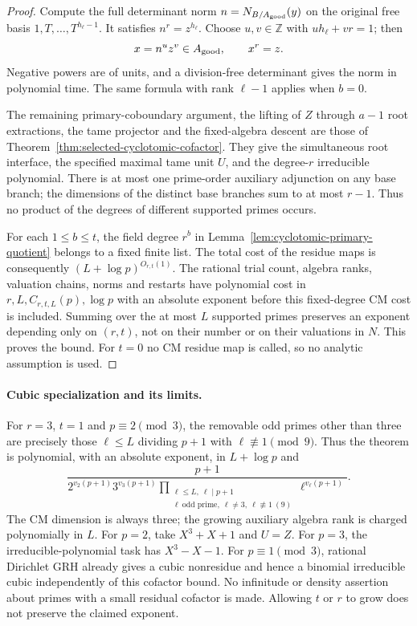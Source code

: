 \documentclass[11pt]{article}
\theoremstyle{definition}
\theoremstyle{remark}
\begin{document}
\begin{proof}
Compute the full determinant norm $n=N_{B/A_{\rm good}}(y)$ on the
original free basis $1,T,\ldots,T^{h_\ell-1}$.  It satisfies
$n^r=z^{h_\ell}$.  Choose $u,v\in\mathbb Z$ with
$uh_\ell+vr=1$; then
\[
 x=n^u z^v\in A_{\rm good},\qquad x^r=z.
\]
Negative powers are of units, and a division-free determinant gives the
norm in polynomial time.  The same formula with rank $\ell-1$ applies
when $b=0$.

The remaining primary-coboundary argument, the lifting of $Z$ through
$a-1$ root extractions, the tame projector and the fixed-algebra descent
are those of Theorem~\ref{thm:selected-cyclotomic-cofactor}.
They give the simultaneous root interface, the specified maximal tame
unit $U$, and the degree-$r$ irreducible polynomial.
There is at most one prime-order auxiliary adjunction on any base branch;
the dimensions of the distinct base branches sum to at most $r-1$.
Thus no product of the degrees of different supported primes occurs.

For each $1\leq b\leq t$, the field degree $r^b$ in
Lemma~\ref{lem:cyclotomic-primary-quotient} belongs to a fixed finite list.
The total cost of the residue maps is consequently
$(L+\log p)^{O_{r,t}(1)}$.  The rational trial count, algebra ranks,
valuation chains, norms and restarts have polynomial cost in
$r,L,C_{r,t,L}(p),\log p$ with an absolute exponent before this fixed-degree
CM cost is included.  Summing over the at most $L$ supported primes
preserves an exponent depending only on $(r,t)$, not on their number or
on their valuations in $N$.  This proves the bound.
For $t=0$ no CM residue map is called, so no analytic assumption is used.
\end{proof}

\paragraph{Cubic specialization and its limits.}
For $r=3$, $t=1$ and $p\equiv2\pmod3$, the removable odd primes other
than three are precisely those $\ell\leq L$ dividing $p+1$ with
$\ell\not\equiv1\pmod9$.  Thus the theorem is polynomial, with an absolute
exponent, in $L+\log p$ and
\[
 \frac{p+1}{2^{v_2(p+1)}3^{v_3(p+1)}
     \prod_{\substack{\ell\leq L,\ \ell\mid p+1\\
       \ell\ \text{odd prime},\ \ell\ne3,\ \ell\not\equiv1\ (9)}}
        \ell^{v_\ell(p+1)}}.
\]
The CM dimension is always three; the growing auxiliary algebra rank is
charged polynomially in $L$.  For $p=2$, take $X^3+X+1$ and $U=Z$.
For $p=3$, the irreducible-polynomial task has $X^3-X-1$.
For $p\equiv1\pmod3$, rational Dirichlet GRH already gives a cubic
nonresidue and hence a binomial irreducible cubic independently of this
cofactor bound.  No infinitude or density assertion about primes with a
small residual cofactor is made.  Allowing $t$ or $r$ to grow does not
preserve the claimed exponent.
\end{document}
